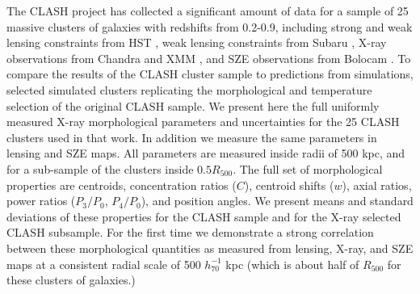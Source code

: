 \documentclass[iop,twocolumn]{emulateapj}
\begin{document}
{The CLASH project \citep{2012ApJ...756..159P} has collected a significant amount of data for a sample of 25 massive clusters of galaxies
with redshifts from 0.2-0.9, including strong and weak lensing
constraints from HST \citep{2015ApJ...806....4M}, weak lensing constraints from Subaru \citep{2014ApJ...795..163U}, 
X-ray observations from Chandra and XMM \citep{2014ApJ...794..136D}, and SZE observations from Bolocam \citep{Czakon2015}.
To compare the results of the CLASH cluster sample 
to predictions from simulations, \citet{meneghetti.etal.2014} selected simulated clusters
replicating the morphological and temperature selection of the original CLASH sample. 
We present here the full uniformly measured X-ray morphological parameters and uncertainties for the 25 CLASH clusters used
in that work. In addition we measure the same parameters in lensing and SZE maps. All parameters are measured inside radii of 500 kpc, and
for a sub-sample of the clusters inside $0.5 R_{500}$. The full set of morphological 
properties are centroids, concentration ratios ($C$), centroid shifts ($w$), axial ratios, power
ratios ($P_3/P_0$, $P_4/P_0$), and position angles.
We present means and standard deviations of these  properties for the CLASH sample and for the X-ray selected CLASH subsample.
For the first time we demonstrate a strong correlation between these morphological quantities as measured from 
lensing, X-ray, and SZE maps at a consistent radial scale of 500 $h_{70}^{-1}$ kpc (which is about half of $R_{500}$ for these clusters of galaxies.)

}
\end{document}
